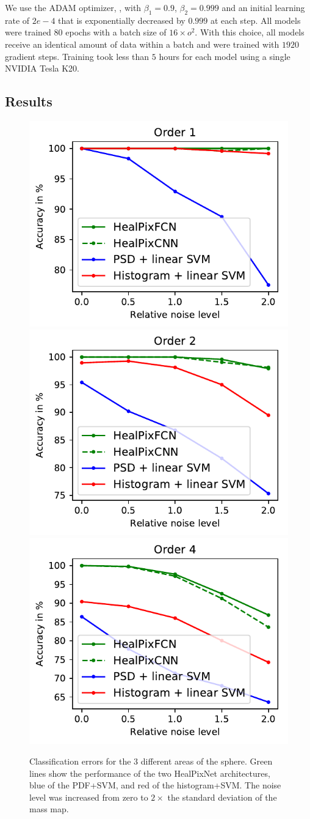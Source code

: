 \documentclass[final,twocolumn,3p,times,authoryear]{elsarticle}
\newcommand{\1}{\b{1}}              %
\newcommand{\0}{\b{0}}              %
\begin{document}
We use the ADAM optimizer, \cite{kingma2014adam}, with $\beta_1=0.9$, $\beta_2=0.999$ and an initial learning rate of $2e-4$ that is exponentially decreased by $0.999$ at each step.
All models were trained $80$ epochs with a batch size of $16\times o^2$. With this choice, all models receive an identical amount of data within a batch and were trained with $1920$ gradient steps.
Training took less than $5$ hours for each model using a single NVIDIA Tesla K20.

\subsection{Results}

\begin{figure}
\centering
\includegraphics[width=0.32\linewidth]{result_order1}
\hfill
\includegraphics[width=0.32\linewidth]{result_order2}
\hfill
\includegraphics[width=0.32\linewidth]{result_order4}
\caption{
Classification errors for the 3 different areas of the sphere.
Green lines show the performance of the two HealPixNet architectures, blue of the PDF+SVM, and red of the histogram+SVM.
The noise level was increased from zero to $2\times$ the standard deviation of the mass map.
}
\label{fig:results}
\end{figure}
\end{document}
